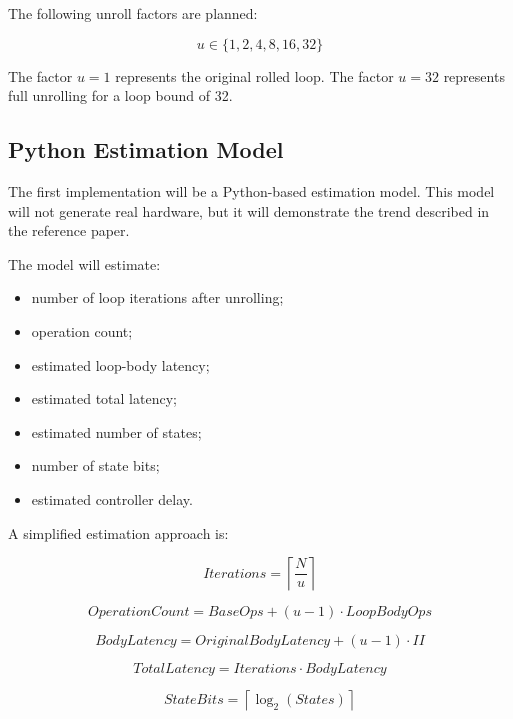 \documentclass[conference]{IEEEtran}
\begin{document}
The following unroll factors are planned:

\begin{equation}
u \in \{1, 2, 4, 8, 16, 32\}
\end{equation}

The factor $u=1$ represents the original rolled loop. The factor $u=32$ represents full unrolling for a loop bound of 32.

\subsection{Python Estimation Model}

The first implementation will be a Python-based estimation model. This model will not generate real hardware, but it will demonstrate the trend described in the reference paper.

The model will estimate:

\begin{itemize}
    \item number of loop iterations after unrolling;
    \item operation count;
    \item estimated loop-body latency;
    \item estimated total latency;
    \item estimated number of states;
    \item number of state bits;
    \item estimated controller delay.
\end{itemize}

A simplified estimation approach is:

\begin{equation}
Iterations = \left\lceil \frac{N}{u} \right\rceil
\end{equation}

\begin{equation}
OperationCount = BaseOps + (u - 1) \cdot LoopBodyOps
\end{equation}

\begin{equation}
BodyLatency = OriginalBodyLatency + (u - 1) \cdot II
\end{equation}

\begin{equation}
TotalLatency = Iterations \cdot BodyLatency
\end{equation}

\begin{equation}
StateBits = \left\lceil \log_2(States) \right\rceil
\end{equation}
\end{document}
